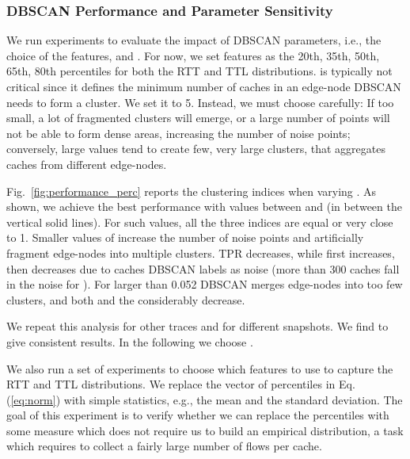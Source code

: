 \documentclass{acm_proc_article-sp}
\newcommand{\node}{{edge-node}\xspace}
\newcommand{\nodes}{{edge-nodes}\xspace}
\begin{document}
\subsubsection{DBSCAN Performance and Parameter Sensitivity}

We run experiments to evaluate the impact of DBSCAN parameters, i.e., the choice of the features,  and .
For now, we set features as the 20th, 35th, 50th, 65th, 80th percentiles for both the RTT and TTL distributions.
 is typically not critical since it defines the minimum number of caches in an \node DBSCAN needs to form a cluster. We set it to 5.
Instead, we must choose  carefully: If too small, a lot of fragmented clusters will emerge, or a large number of points will not be able to form dense areas, increasing the number of noise points; conversely, large values tend to create few, very large clusters, that aggregates caches from different \nodes.

Fig.~\ref{fig:performance_perc} reports the clustering indices when varying . As shown, we achieve the best performance with values between  and  (in between the vertical solid lines). For such values, all the three indices are equal or very close to 1.
Smaller values of  increase the number of noise points and artificially fragment \nodes into multiple clusters. TPR decreases, while  first increases, then decreases due to caches DBSCAN labels as noise (more than 300 caches fall in the noise for ).
For  larger than 0.052 DBSCAN merges \nodes into too few clusters, and both  and the  considerably decrease.

We repeat this analysis for other traces and for different snapshots. We find  to give consistent results. In the following we choose .

We also run a set of experiments to choose which features to use to capture the RTT and TTL distributions.
We replace the vector of percentiles  in Eq.(\ref{eq:norm}) with simple statistics, e.g., the mean and the standard deviation. The goal of this experiment is to verify whether we can replace the percentiles with some measure which does not require us to build an empirical distribution, a task which requires to collect a fairly large number of flows per cache.
\end{document}
